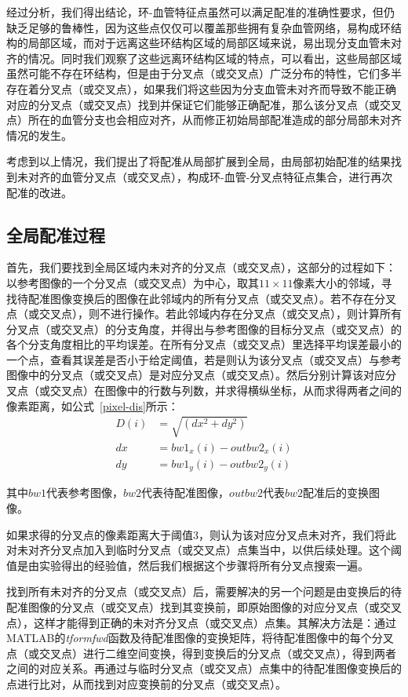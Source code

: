 经过分析，我们得出结论，环-血管特征点虽然可以满足配准的准确性要求，但仍缺乏足够的鲁棒性，因为这些点仅仅可以覆盖那些拥有复杂血管网络，易构成环结构的局部区域，而对于远离这些环结构区域的局部区域来说，易出现分支血管未对齐的情况。同时我们观察了这些远离环结构区域的特点，可以看出，这些局部区域虽然可能不存在环结构，但是由于分叉点（或交叉点）广泛分布的特性，它们多半存在着分叉点（或交叉点），如果我们将这些因为分支血管未对齐而导致不能正确对应的分叉点（或交叉点）找到并保证它们能够正确配准，那么该分叉点（或交叉点）所在的血管分支也会相应对齐，从而修正初始局部配准造成的部分局部未对齐情况的发生。

考虑到以上情况，我们提出了将配准从局部扩展到全局，由局部初始配准的结果找到未对齐的血管分叉点（或交叉点），构成环-血管-分叉点特征点集合，进行再次配准的改进。

\subsection{全局配准过程}
首先，我们要找到全局区域内未对齐的分叉点（或交叉点），这部分的过程如下：以参考图像的一个分叉点（或交叉点）为中心，取其$11\times11$像素大小的邻域，寻找待配准图像变换后的图像在此邻域内的所有分叉点（或交叉点）。若不存在分叉点（或交叉点），则不进行操作。若此邻域内存在分叉点（或交叉点），则计算所有分叉点（或交叉点）的分支角度，并得出与参考图像的目标分叉点（或交叉点）的各个分支角度相比的平均误差。在所有分叉点（或交叉点）里选择平均误差最小的一个点，查看其误差是否小于给定阈值，若是则认为该分叉点（或交叉点）与参考图像中的分叉点（或交叉点）是对应分叉点（或交叉点）。然后分别计算该对应分叉点（或交叉点）在图像中的行数与列数，并求得横纵坐标，从而求得两者之间的像素距离，如公式~\ref{pixel-dis}所示：
\begin{equation}
\begin{split}
D(i)&=\sqrt{(dx^2+dy^2)}\\
dx&=bw1_x(i)-outbw2_x(i)\\
dy&=bw1_y(i)-outbw2_y(i)
\end{split}
\label{pixel-dis}
\end{equation}

其中$bw1$代表参考图像，$bw2$代表待配准图像，$outbw2$代表$bw2$配准后的变换图像。

如果求得的分叉点的像素距离大于阈值3，则认为该对应分叉点未对齐，我们将此对未对齐分叉点加入到临时分叉点（或交叉点）点集当中，以供后续处理。这个阈值是由实验得出的经验值，然后我们根据这个步骤将所有分叉点搜索一遍。

找到所有未对齐的分叉点（或交叉点）后，需要解决的另一个问题是由变换后的待配准图像的分叉点（或交叉点）找到其变换前，即原始图像的对应分叉点（或交叉点），这样才能得到正确的未对齐分叉点（或交叉点）点集。其解决方法是：通过MATLAB的\emph{tformfwd}函数及待配准图像的变换矩阵，将待配准图像中的每个分叉点（或交叉点）进行二维空间变换，得到变换后的分叉点（或交叉点），得到两者之间的对应关系。再通过与临时分叉点（或交叉点）点集中的待配准图像变换后的点进行比对，从而找到对应变换前的分叉点（或交叉点）。


